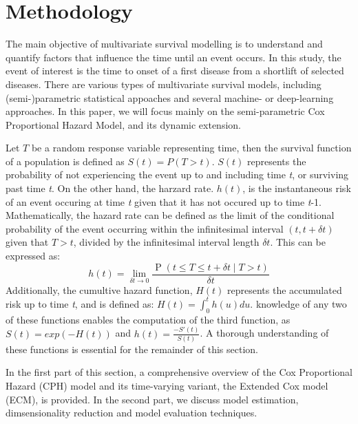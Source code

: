 \chapter{Methodology}
\label{chap:methodology}
The main objective of multivariate survival modelling is to understand and quantify factors that influence the time until an event occurs. In this study, the event of interest is the time to onset of a first disease from a shortlift of selected diseases. There are various types of multivariate survival models, including (semi-)parametric statistical appoaches and several machine- or deep-learning approaches. In this paper, we will focus mainly on the semi-parametric Cox Proportional Hazard Model, and its dynamic extension. 

Let $T$ be a random response variable representing time, then the survival function of a population is defined as \begin{math}
    S(t) = P(T>t)
\end{math}. $S(t)$ represents the probability of not experiencing the event up to and including time \textit{t}, or surviving past time \textit{t}. On the other hand, the harzard rate. $h(t)$, is the instantaneous risk of an event occuring at time \textit{t} given that it has not occured up to time \textit{t}-1. Mathematically, the hazard rate can be defined as the limit of the conditional probability of the event occurring within the infinitesimal interval $(t, t+\delta t)$ given that $T > t$, divided by the infinitesimal interval length $\delta t$. This can be expressed as:
$$
h(t)=\lim _{\delta t \rightarrow 0} \frac{\operatorname{P}(t \leq T \leq t+\delta t \mid T>t)}{\delta t}
$$
Additionally, the cumultive hazard function, $H(t)$ represents the accumulated risk up to time \textit{t}, and is defined as: $H(t) = \int_{0}^{t}h(u)du$. knowledge of any two of these functions enables the computation of the third function, as $S(t) = exp(-H(t))$ and $h(t) = \frac{-S'(t)}{S(t)}$. A thorough understanding of these functions is essential for the remainder of this section. 

In the first part of this section, a comprehensive overview of the Cox Proportional Hazard (CPH) model and its time-varying variant, the Extended Cox model (ECM), is provided. In the second part, we discuss model estimation, dimsensionality reduction and model evaluation techniques. 


